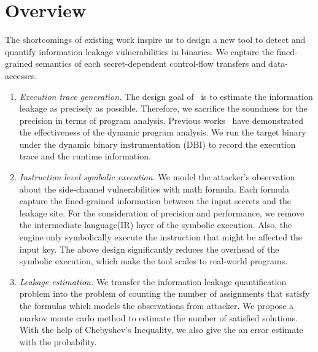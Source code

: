 \section{Overview}
The shortcomings of existing work inspire us to design a new tool to detect
and quantify information leakage vulnerabilities in binaries. We capture the 
fined-grained semantics of each secret-dependent control-flow transfers 
and data-accesses. 

\begin{enumerate}
    \item \textit{Execution trace generation.} The design goal of \tana\ is to
    estimate the information leakage as precisely as possible. Therefore,
    we sacrifice the soundness for the precision in terms of program analysis.
    Previous works~\cite{203878,217537} have demonstrated the effectiveness of the
    dynamic program analysis. We run the target binary under the dynamic binary
    instrumentation (DBI) to record the execution trace and the runtime information.
    \item \textit{Instruction level symbolic execution.} We model the 
    attacker's observation about the side-channel vulnerabilities with math
    formula. Each formula capture the fined-grained information between the input secrets
    and the leakage site. For the consideration of precision and performance, 
    we remove the intermediate language(IR) layer of the symbolic execution. 
    Also, the engine only symbolically execute the instruction that might be affected the
    input key. The above design significantly reduces the overhead of the symbolic
    execution, which make the tool scales to real-world programs.
    \item \textit{Leakage estimation.} We transfer the information leakage quantification
    problem into the problem of counting the number of assignments that satisfy the formulas
    which models the observations from attacker. We propose a markov monte carlo method to 
    estimate the number of satisfied solutions. With the help of Chebyshev's Inequality,
    we also give the an error estimate with the probability.
\end{enumerate}
